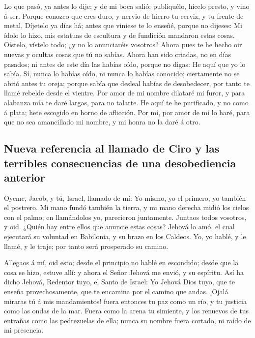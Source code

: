  Lo que pasó, ya antes lo dije; y de mi boca salió;
publiquélo, hícelo presto, y vino á ser.  Porque conozco que
eres duro, y nervio de hierro tu cerviz, y tu frente de metal,
 Díjetelo ya días há; antes que viniese te lo enseñé, porque
no dijeses: Mi ídolo lo hizo, mis estatuas de escultura y de fundición
mandaron estas cosas.  Oístelo, vístelo todo; ¿y no lo
anunciaréis vosotros? Ahora pues te he hecho oir nuevas y ocultas cosas
que tú no sabías.  Ahora han sido criadas, no en días
pasados; ni antes de este día las habías oído, porque no digas: He aquí
que yo lo sabía.  Sí, nunca lo habías oído, ni nunca lo
habías conocido; ciertamente no se abrió antes tu oreja; porque sabía
que desleal habías de desobedecer, por tanto te llamé rebelde desde el
vientre.  Por amor de mi nombre dilataré mi furor, y para
alabanza mía te daré largas, para no talarte.  He aquí te
he purificado, y no como á plata; hete escogido en horno de aflicción.
 Por mí, por amor de mí lo haré, para que no sea
amancillado mi nombre, y mi honra no la daré á otro.

\hypertarget{nueva-referencia-al-llamado-de-ciro-y-las-terribles-consecuencias-de-una-desobediencia-anterior}{%
\subsection{Nueva referencia al llamado de Ciro y las terribles
consecuencias de una desobediencia
anterior}\label{nueva-referencia-al-llamado-de-ciro-y-las-terribles-consecuencias-de-una-desobediencia-anterior}}

 Oyeme, Jacob, y tú, Israel, llamado de mí: Yo mismo, yo el
primero, yo también el postrero.  Mi mano fundó también la
tierra, y mi mano derecha midió los cielos con el palmo; en llamándolos
yo, parecieron juntamente.  Juntaos todos vosotros, y oid.
¿Quién hay entre ellos que anuncie estas cosas? Jehová lo amó, el cual
ejecutará su voluntad en Babilonia, y su brazo en los Caldeos.
 Yo, yo hablé, y le llamé, y le traje; por tanto será
prosperado su camino.

 Allegaos á mí, oid esto; desde el principio no hablé en
escondido; desde que la cosa se hizo, estuve allí: y ahora el Señor
Jehová me envió, y su espíritu.  Así ha dicho Jehová,
Redentor tuyo, el Santo de Israel: Yo Jehová Dios tuyo, que te enseña
provechosamente, que te encamina por el camino que andas. 
¡Ojalá miraras tú á mis mandamientos! fuera entonces tu paz como un río,
y tu justicia como las ondas de la mar.  Fuera como la
arena tu simiente, y los renuevos de tus entrañas como las pedrezuelas
de ella; nunca su nombre fuera cortado, ni raído de mi presencia.

